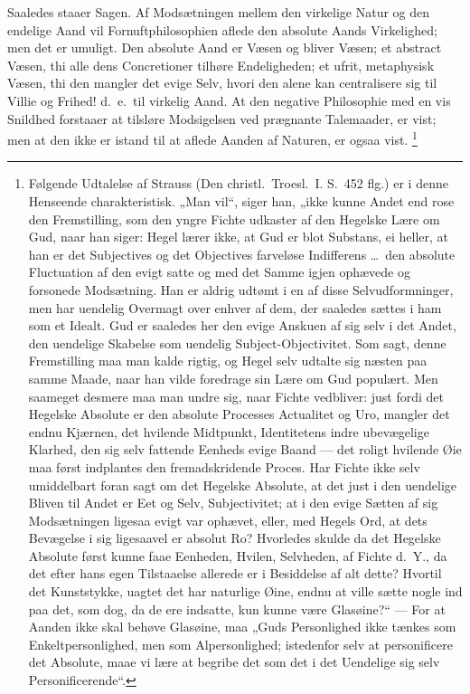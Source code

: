 \documentclass[12pt]{book}
\begin{document}
Saaledes staaer Sagen. Af Modsætningen mellem den virkelige Natur og
den endelige Aand vil Fornuftphilosophien aflede den absolute Aands
Virkelighed; men det er umuligt. Den absolute Aand er Væsen og
bliver Væsen; et abstract Væsen, thi alle dens Concretioner tilhøre
Endeligheden; et ufrit, metaphysisk Væsen, thi den mangler det evige
Selv, hvori den alene kan centralisere sig til Villie og Frihed!
d.\ e.\ til virkelig Aand. At den negative Philosophie med en vis
Snildhed forstaaer at tilsløre Modsigelsen ved prægnante
Talemaader, er vist; men at den ikke er istand til at aflede Aanden
af Naturen, er ogsaa vist.%
\footnote{Følgende Udtalelse af Strauss (Den christl.\ Troesl.\ I.
S.\ 452 flg.) er i denne Henseende charakteristisk. „Man vil“, siger
han, „ikke kunne Andet end rose den Fremstilling, som den yngre
Fichte udkaster af den Hegelske Lære om Gud, naar han siger: Hegel
lærer ikke, at Gud er blot Substans, ei heller, at han er det
Subjectives og det Objectives farveløse Indifferens \dots\ den
absolute Fluctuation af den evigt satte og med det Samme igjen
ophævede og forsonede Modsætning. Han er aldrig udtømt i en af disse
Selvudformninger, men har uendelig Overmagt over enhver af dem, der
saaledes sættes i ham som et Idealt. Gud er saaledes her den evige
Anskuen af sig selv i det Andet, den uendelige Skabelse som uendelig
Subject-Objectivitet. Som sagt, denne Fremstilling maa man kalde
rigtig, og Hegel selv udtalte sig næsten paa samme Maade, naar han
vilde foredrage sin Lære om Gud populært. Men saameget desmere maa
man undre sig, naar Fichte vedbliver: just fordi det Hegelske
Absolute er den absolute Processes Actualitet og Uro, mangler det
endnu Kjærnen, det hvilende Midtpunkt, Identitetens indre
ubevægelige Klarhed, den sig selv fattende Eenheds evige Baand ---
det roligt hvilende Øie maa først indplantes den fremadskridende
Proces. Har Fichte ikke selv umiddelbart foran sagt om det Hegelske
Absolute, at det just i den uendelige Bliven til Andet er Eet og
Selv, Subjectivitet; at i den evige Sætten af sig Modsætningen
ligesaa evigt var ophævet, eller, med Hegels Ord, at dets Bevægelse
i sig ligesaavel er absolut Ro? Hvorledes skulde da det Hegelske
Absolute først kunne faae Eenheden, Hvilen, Selvheden, af Fichte
d.\ Y., da det efter hans egen Tilstaaelse allerede er i Besiddelse
af alt dette? Hvortil det Kunststykke, uagtet det har naturlige
Øine, endnu at ville sætte nogle ind paa det, som dog, da de ere
indsatte, kun kunne være Glasøine?“ --- For at Aanden ikke skal
behøve Glasøine, maa „Guds Personlighed ikke tænkes som
Enkeltpersonlighed, men som Alpersonlighed; istedenfor selv at
personificere det Absolute, maae vi lære at begribe det som det i
det Uendelige sig selv Personificerende“.}
\end{document}
